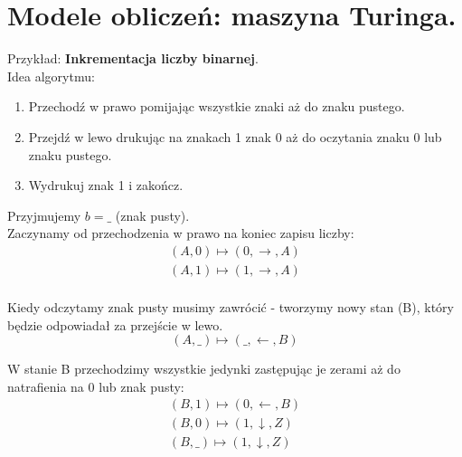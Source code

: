 \documentclass[main.tex]{subfiles}
\begin{document}
    \newpage

    \section{Modele obliczeń: maszyna Turinga.}

    Przykład: \textbf{Inkrementacja liczby binarnej}.\\

    \noindent Idea algorytmu:
    \begin{enumerate}
        \item Przechodź w prawo pomijając wszystkie znaki aż do znaku pustego.
        \item Przejdź w lewo drukując na znakach 1 znak 0 aż do oczytania znaku 0 lub znaku pustego.
        \item Wydrukuj znak 1 i zakończ.
    \end{enumerate}
    Przyjmujemy $b = \_$ (znak pusty).\\


    Zaczynamy od przechodzenia w prawo na koniec zapisu liczby:
    \begin{gather*}
        (A, 0) \mapsto (0, \rightarrow, A)\\
        (A, 1) \mapsto (1, \rightarrow, A)\\
    \end{gather*}

    Kiedy odczytamy znak pusty musimy zawrócić - tworzymy nowy stan (B), który będzie odpowiadał za przejście w lewo.
    \[ (A, \_) \mapsto (\_, \leftarrow, B) \]

    W stanie B przechodzimy wszystkie jedynki zastępując je zerami aż do natrafienia na 0 lub znak pusty:
    \begin{gather*}
        (B, 1) \mapsto (0, \leftarrow, B)\\
        (B, 0) \mapsto (1, \downarrow, Z)\\
        (B, \_) \mapsto (1, \downarrow, Z)\\
    \end{gather*}
\end{document}
